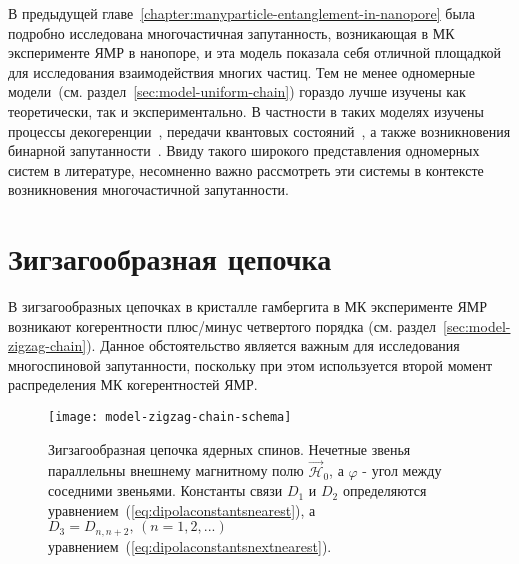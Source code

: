 В предыдущей главе~\ref{chapter:manyparticle-entanglement-in-nanopore}
была подробно исследована многочастичная запутанность,
возникающая в МК эксперименте ЯМР в нанопоре,
и эта модель показала себя отличной площадкой
для исследования взаимодействия многих частиц.
Тем не менее одномерные модели~(см. раздел~\ref{sec:model-uniform-chain})
гораздо лучше изучены как теоретически,
так и экспериментально.
В частности в таких моделях изучены процессы
декогеренции~\cite{Bochkin2018},
передачи квантовых состояний~\cite{Lazarev2019, Feldman2020, Bochkin2022},
а также возникновения бинарной запутанности~\cite{Feldman2012, Lazarev2019}.
Ввиду такого широкого представления одномерных систем в литературе,
несомненно важно рассмотреть эти системы в контексте возникновения многочастичной запутанности.


\section{Зигзагообразная цепочка}
В зигзагообразных цепочках в кристалле гамбергита в МК эксперименте ЯМР возникают когерентности плюс/минус четвертого порядка (см. раздел~\ref{sec:model-zigzag-chain}).
Данное обстоятельство является важным для исследования многоспиновой запутанности,
поскольку при этом используется второй момент распределения МК когерентностей ЯМР.

\begin{figure}[H]
    \centering
    \texttt{[image: model-zigzag-chain-schema]}
    \caption{
      Зигзагообразная цепочка ядерных спинов.
      Нечетные звенья параллельны внешнему магнитному полю $\vec{\mathcal H}_0$,
      а $\varphi$ - угол между соседними звеньями.
      Константы связи $D_1$ и $D_2$ определяются уравнением~(\ref{eq:dipolaconstantsnearest}), а $D_3=D_{n, n+2},\, (n=1,2,...)$
      уравнением~(\ref{eq:dipolaconstantsnextnearest}).
    }
    \label{fig:model-zigzag-chain-schema}
\end{figure}


